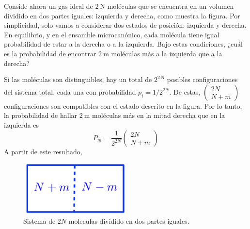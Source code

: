 Conside ahora un gas ideal de $2 \mathrm{~N}$ moléculas que se encuentra en un volumen dividido en dos partes iguales: izquierda y derecha, como muestra la figura. Por simplicidad, solo vamos a considerar dos estados de posición: izquierda y derecha. En equilibrio, y en el ensamble microcanónico, cada molécula tiene igual probabilidad de estar a la derecha o a la izquierda. Bajo estas condiciones, ¿cuál es la probabilidad de encontrar $2 \mathrm{~m}$ moléculas más a la izquierda que a la derecha?

Si las moléculas son distinguibles, hay un total de $2^{2 \mathrm{~N}}$ posibles configuraciones del sistema total, cada una con probabilidad $p_i=1 / 2^{2 N}$. De estas, $\left(\begin{array}{c}2 N \\ N+m\end{array}\right)$ configuraciones son compatibles con el estado descrito en la figura. Por lo tanto, la probabilidad de hallar $2 \mathrm{~m}$ moléculas más en la mitad derecha que en la izquierda es
$$
P_m=\frac{1}{2^{2 N}}\left(\begin{array}{c}
2 N \\
N+m
\end{array}\right)
$$
A partir de este resultado,
\begin{figure}
    \centering
    \includegraphics[width=0.5\textwidth]{punto2/cajadividaen2.png}
    \caption{Sistema de $2N$ moleculas dividido en dos partes iguales.}
    \label{fig:my_label}
\end{figure}